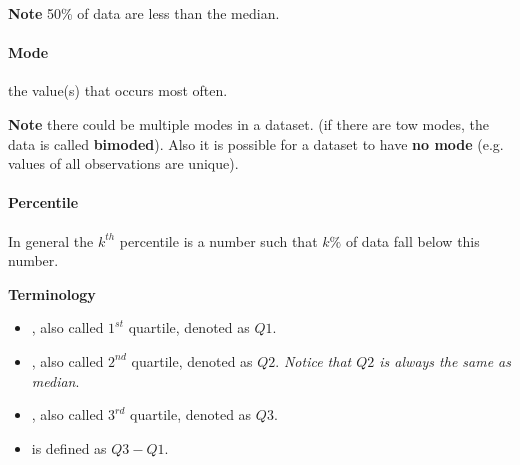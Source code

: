\documentclass[11pt]{article}
\begin{document}
	\textbf{Note} 50\% of data are less than the median.
	
	\paragraph{Mode} the value(s) that occurs most often.
	
	\textbf{Note} there could be multiple modes in a dataset. (if there are tow modes, the data is called \textbf{bimoded}). Also it is possible for a dataset to have \textbf{no mode} (e.g. values of all observations are unique).
	
	\paragraph{Percentile} In general the $k^{th}$ percentile is a number such that $k\%$ of data fall below this number.
	
	\textbf{Terminology}
	\begin{itemize}
		\item {}, also called $1^{st}$ quartile, denoted as $Q1$.
		\item {}, also called $2^{nd}$ quartile, denoted as $Q2$. \emph{Notice that $Q2$ is always the same as median}.
		\item {}, also called $3^{rd}$ quartile, denoted as $Q3$.
		\item {} is defined as $Q3 - Q1$.
	\end{itemize}
\end{document}
